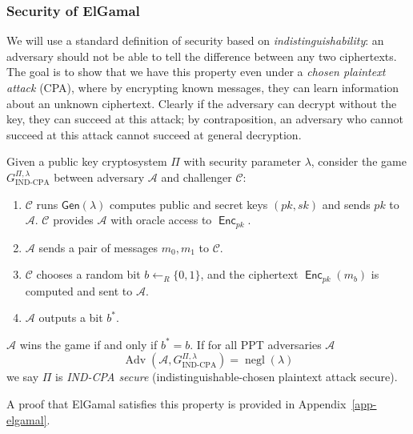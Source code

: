 \documentclass[12pt,a4paper]{article}
\DeclareMathOperator{\negl}{\text{negl}}
\DeclareMathOperator{\Adv}{\text{Adv}}
\DeclareMathOperator{\Enc}{\mathsf{Enc}}
\theoremstyle{definition}
\begin{document}
\subsubsection{Security of ElGamal}
We will use a standard definition of security based on \textit{indistinguishability}: an adversary should not be able to tell the difference between any two ciphertexts. The goal is to show that we have this property even under a \textit{chosen plaintext attack} (CPA), where by encrypting known messages, they can learn information about an unknown ciphertext. Clearly if the adversary can decrypt without the key, they can succeed at this attack; by contraposition, an adversary who cannot succeed at this attack cannot succeed at general decryption.
\newpage
\begin{definition}
    Given a public key cryptosystem $\Pi$ with security parameter $\lambda$, consider the game $G_{\text{IND-CPA}}^{\Pi,\lambda}$ between adversary $\mathcal{A}$ and challenger $\mathcal{C}$:
    \begin{enumerate}
        \item $\mathcal{C}$ runs $\mathsf{Gen}(\lambda)$ computes public and secret keys $(pk, sk)$ and sends $pk$ to $\mathcal{A}$. $\mathcal{C}$ provides $\mathcal{A}$ with oracle access to $\Enc_{pk}$.
        \item $\mathcal{A}$ sends a pair of messages $m_0, m_1$ to $\mathcal{C}$.
        \item $\mathcal{C}$ chooses a random bit $b\gets_R\{0, 1\}$, and the ciphertext $\Enc_{pk}(m_b)$ is computed and sent to $\mathcal{A}$.
        \item $\mathcal{A}$ outputs a bit $b^*$.
    \end{enumerate}
    $\mathcal{A}$ wins  the game if and only if $b^*=b$. If for all PPT adversaries $\mathcal{A}$
    $$\Adv\left(\mathcal{A},G^{\Pi,\lambda}_{\text{IND-CPA}}\right)=\negl(\lambda)$$
    we say $\Pi$ is \textit{IND-CPA secure} (indistinguishable-chosen plaintext attack secure).
\end{definition}

A proof that ElGamal satisfies this property is provided in Appendix~\ref{app-elgamal}.
\end{document}
